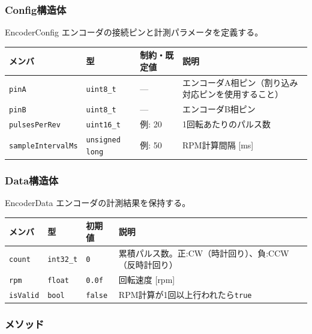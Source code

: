\subsubsection{Config構造体}

\begin{funcblock}{EncoderConfig}
エンコーダの接続ピンと計測パラメータを定義する。

\begin{longtable}{l l l p{4.8cm}}
\toprule
\textbf{メンバ} & \textbf{型} & \textbf{制約・既定値} & \textbf{説明} \\
\midrule
\endhead
\texttt{pinA}             & \texttt{uint8\_t}       & ---       & エンコーダA相ピン（割り込み対応ピンを使用すること） \\
\texttt{pinB}             & \texttt{uint8\_t}       & ---       & エンコーダB相ピン \\
\texttt{pulsesPerRev}     & \texttt{uint16\_t}      & 例: 20    & 1回転あたりのパルス数 \\
\texttt{sampleIntervalMs} & \texttt{unsigned long}  & 例: 50    & RPM計算間隔 [ms] \\
\bottomrule
\end{longtable}
\end{funcblock}

\subsubsection{Data構造体}

\begin{funcblock}{EncoderData}
エンコーダの計測結果を保持する。

\begin{longtable}{l l l p{5.0cm}}
\toprule
\textbf{メンバ} & \textbf{型} & \textbf{初期値} & \textbf{説明} \\
\midrule
\endhead
\texttt{count}   & \texttt{int32\_t} & \texttt{0}     & 累積パルス数。正:CW（時計回り）、負:CCW（反時計回り） \\
\texttt{rpm}     & \texttt{float}    & \texttt{0.0f}  & 回転速度 [rpm] \\
\texttt{isValid} & \texttt{bool}     & \texttt{false} & RPM計算が1回以上行われたら\texttt{true} \\
\bottomrule
\end{longtable}
\end{funcblock}

\subsubsection{メソッド}

